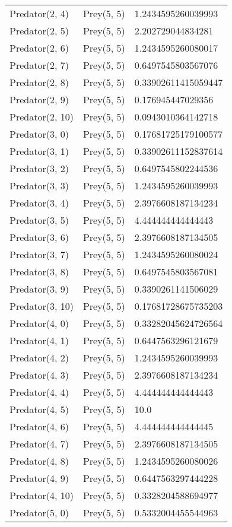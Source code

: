 \begin{longtable}{| p{} | p{} | p{} |}
Predator(2, 4) & Prey(5, 5) &1.2434595260039993\\
Predator(2, 5) & Prey(5, 5) &2.202729044834281\\
Predator(2, 6) & Prey(5, 5) &1.2434595260080017\\
Predator(2, 7) & Prey(5, 5) &0.6497545803567076\\
Predator(2, 8) & Prey(5, 5) &0.33902611415059447\\
Predator(2, 9) & Prey(5, 5) &0.176945447029356\\
Predator(2, 10) & Prey(5, 5) &0.0943010364142718\\
Predator(3, 0) & Prey(5, 5) &0.17681725179100577\\
Predator(3, 1) & Prey(5, 5) &0.33902611152837614\\
Predator(3, 2) & Prey(5, 5) &0.6497545802244536\\
Predator(3, 3) & Prey(5, 5) &1.2434595260039993\\
Predator(3, 4) & Prey(5, 5) &2.3976608187134234\\
Predator(3, 5) & Prey(5, 5) &4.444444444444443\\
Predator(3, 6) & Prey(5, 5) &2.3976608187134505\\
Predator(3, 7) & Prey(5, 5) &1.2434595260080024\\
Predator(3, 8) & Prey(5, 5) &0.6497545803567081\\
Predator(3, 9) & Prey(5, 5) &0.3390261141506029\\
Predator(3, 10) & Prey(5, 5) &0.17681728675735203\\
Predator(4, 0) & Prey(5, 5) &0.33282045624726564\\
Predator(4, 1) & Prey(5, 5) &0.6447563296121679\\
Predator(4, 2) & Prey(5, 5) &1.2434595260039993\\
Predator(4, 3) & Prey(5, 5) &2.3976608187134234\\
Predator(4, 4) & Prey(5, 5) &4.444444444444443\\
Predator(4, 5) & Prey(5, 5) &10.0\\
Predator(4, 6) & Prey(5, 5) &4.444444444444445\\
Predator(4, 7) & Prey(5, 5) &2.3976608187134505\\
Predator(4, 8) & Prey(5, 5) &1.2434595260080026\\
Predator(4, 9) & Prey(5, 5) &0.6447563297444228\\
Predator(4, 10) & Prey(5, 5) &0.3328204588694977\\
Predator(5, 0) & Prey(5, 5) &0.5332004455544963\\

\end{longtable}
